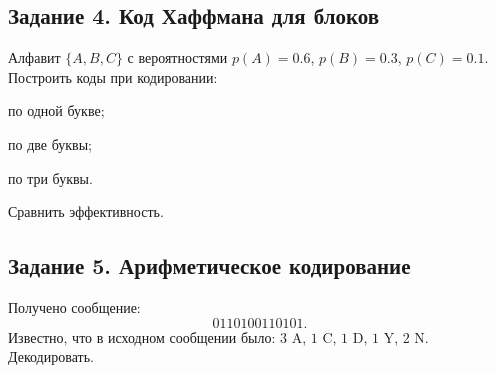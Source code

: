 \documentclass[a4paper,12pt,oneside]{article}
\newcommand{\Task}[1]{%
  \subsection*{#1}%
  \vspace{-0.2\baselineskip}%
}
\begin{document}
\Task{Задание 4. Код Хаффмана для блоков}
Алфавит $\{A,B,C\}$ с вероятностями $p(A)=0.6$, $p(B)=0.3$, $p(C)=0.1$.
Построить коды при кодировании:
\begin{alphlist}
    \item по одной букве;
    \item по две буквы;
    \item по три буквы.
\end{alphlist}
Сравнить эффективность.

\Task{Задание 5. Арифметическое кодирование}
Получено сообщение:
\[
0110100110101.
\]
Известно, что в исходном сообщении было: $3$ A, $1$ C, $1$ D, $1$ Y, $2$ N. Декодировать.
\end{document}
